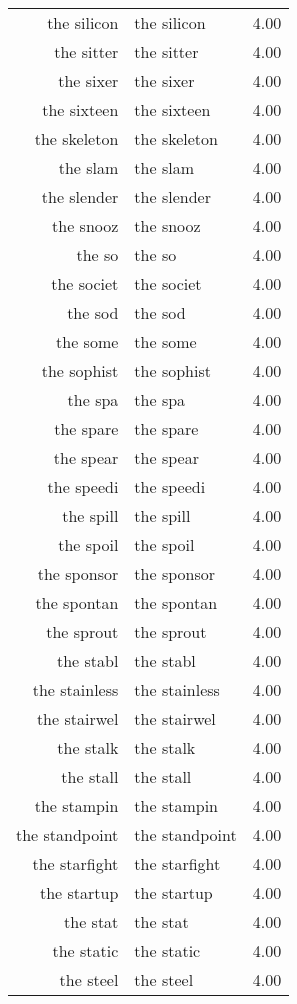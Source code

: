 \begin{table}[ht]
\begin{tabular}{rlr}
  the silicon & the silicon & 4.00 \\ 
  the sitter & the sitter & 4.00 \\ 
  the sixer & the sixer & 4.00 \\ 
  the sixteen & the sixteen & 4.00 \\ 
  the skeleton & the skeleton & 4.00 \\ 
  the slam & the slam & 4.00 \\ 
  the slender & the slender & 4.00 \\ 
  the snooz & the snooz & 4.00 \\ 
  the so & the so & 4.00 \\ 
  the societ & the societ & 4.00 \\ 
  the sod & the sod & 4.00 \\ 
  the some & the some & 4.00 \\ 
  the sophist & the sophist & 4.00 \\ 
  the spa & the spa & 4.00 \\ 
  the spare & the spare & 4.00 \\ 
  the spear & the spear & 4.00 \\ 
  the speedi & the speedi & 4.00 \\ 
  the spill & the spill & 4.00 \\ 
  the spoil & the spoil & 4.00 \\ 
  the sponsor & the sponsor & 4.00 \\ 
  the spontan & the spontan & 4.00 \\ 
  the sprout & the sprout & 4.00 \\ 
  the stabl & the stabl & 4.00 \\ 
  the stainless & the stainless & 4.00 \\ 
  the stairwel & the stairwel & 4.00 \\ 
  the stalk & the stalk & 4.00 \\ 
  the stall & the stall & 4.00 \\ 
  the stampin & the stampin & 4.00 \\ 
  the standpoint & the standpoint & 4.00 \\ 
  the starfight & the starfight & 4.00 \\ 
  the startup & the startup & 4.00 \\ 
  the stat & the stat & 4.00 \\ 
  the static & the static & 4.00 \\ 
  the steel & the steel & 4.00 \\ 

\end{tabular}
\end{table}
